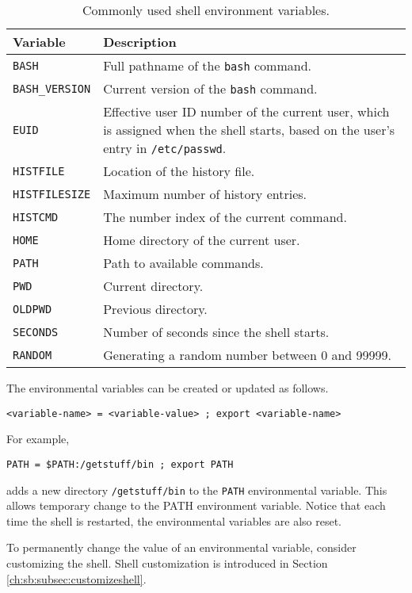 \begin{table}
	\centering \caption{Commonly used shell environment variables.}\label{ch:sb:tab:shellenvironmentvars}
	\begin{tabularx}{\textwidth}{lX}
		\hline
		Variable & Description \\ \hline
		\verb|BASH| & Full pathname of the \verb|bash| command. \\ 
		\verb|BASH_VERSION| & Current version of the \verb|bash| command. \\ 
		\verb|EUID| & Effective user ID number of the current user, which is assigned when the shell starts, based on the user's entry in \verb|/etc/passwd|. \\ 
		\verb|HISTFILE| & Location of the history file. \\ 
		\verb|HISTFILESIZE| & Maximum number of history entries. \\ 
		\verb|HISTCMD| & The number index of the current command. \\ 
		\verb|HOME| & Home directory of the current user. \\ 
		\verb|PATH| & Path to available commands. \\ 
		\verb|PWD| & Current directory. \\ 
		\verb|OLDPWD| & Previous directory. \\ 
		\verb|SECONDS| & Number of seconds since the shell starts. \\ 
		\verb|RANDOM| & Generating a random number between 0 and 99999. \\
		\hline
	\end{tabularx}
\end{table}

The environmental variables can be created or updated as follows.
\begin{lstlisting}
<variable-name> = <variable-value> ; export <variable-name>
\end{lstlisting}
For example,
\begin{lstlisting}
PATH = $PATH:/getstuff/bin ; export PATH
\end{lstlisting}
adds a new directory \verb|/getstuff/bin| to the \verb|PATH| environmental variable. This allows temporary change to the PATH environment variable. Notice that each time the shell is restarted, the environmental variables are also reset. 

To permanently change the value of an environmental variable, consider customizing the shell. Shell customization is introduced in Section \ref{ch:sb:subsec:customizeshell}.

